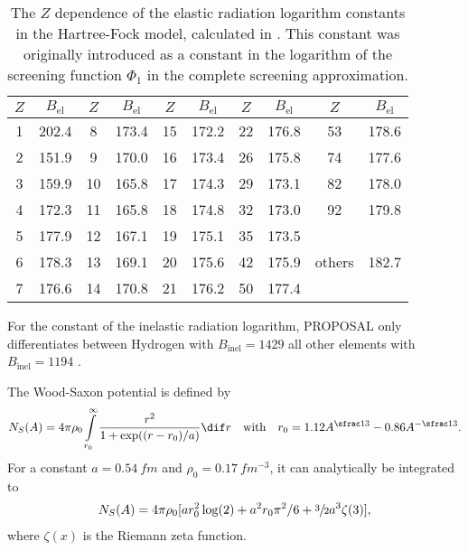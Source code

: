 \begin{table}
    \caption{The $Z$ dependence of the elastic radiation logarithm constants in the Hartree-Fock model, calculated in \cite{Kelner99RadLog}. This constant was originally introduced as a constant in the logarithm of the screening function $\Phi_1$ in the complete screening approximation.}
    \label{tab:rad_log}
    \begin{center}
    \begin{tabular}{cc|cc|cc|cc|cc}
        \toprule
        $Z$ & $B_{\text{el}}$ & $Z$ & $B_{\text{el}}$ & $Z$ & $B_{\text{el}}$ & $Z$ & $B_{\text{el}}$ & $Z$ & $B_{\text{el}}$ \\
        \midrule
        1 & 202.4 & 8 & 173.4 & 15 & 172.2 & 22 & 176.8 & 53 & 178.6 \\
        2 & 151.9 & 9 & 170.0 & 16 & 173.4 & 26 & 175.8 & 74 & 177.6 \\
        3 & 159.9 & 10 & 165.8 & 17 & 174.3 & 29 & 173.1 & 82 & 178.0 \\
        4 & 172.3 & 11 & 165.8 & 18 & 174.8 & 32 & 173.0 & 92 & 179.8 \\
        5 & 177.9 & 12 & 167.1 & 19 & 175.1 & 35 & 173.5 & & \\
        6 & 178.3 & 13 & 169.1 & 20 & 175.6 & 42 & 175.9 & others & 182.7 \\
        7 & 176.6 & 14 & 170.8 & 21 & 176.2 & 50 & 177.4 & & \\
        \bottomrule
    \end{tabular}
    \end{center}
\end{table}
For the constant of the inelastic radiation logarithm, PROPOSAL only differentiates between Hydrogen with $B_{\text{inel}} = 1429$ all other elements with $B_{\text{inel}} = 1194$ \cite{Tsai74, Tsai77}.

The Wood-Saxon potential is defined by \cite{Butkevich02}
\begin{align}
    N_S(A) = 4 \pi \rho_0 \int\limits_{r_0}^{\infty} \frac{r^2}{1+\exp((r-r_0)/a)} \dif r
    \quad \text{with} \quad
    r_0 = 1.12 A^{\sfrac13} - 0.86 A^{-\sfrac13} .
\end{align}
For a constant $a = \SI{0.54}{fm}$ and $\rho_0 = \SI{0.17}{fm^{-3}}$, it can analytically be integrated to
\begin{align}
    N_S(A) = 4 \pi \rho_0 [a r_0^2\log(2) + a^2 r_0 \pi^2 / 6 + \sfrac32 a^3 \zeta(3)] ,
\end{align}
where $\zeta(x)$ is the Riemann zeta function.

